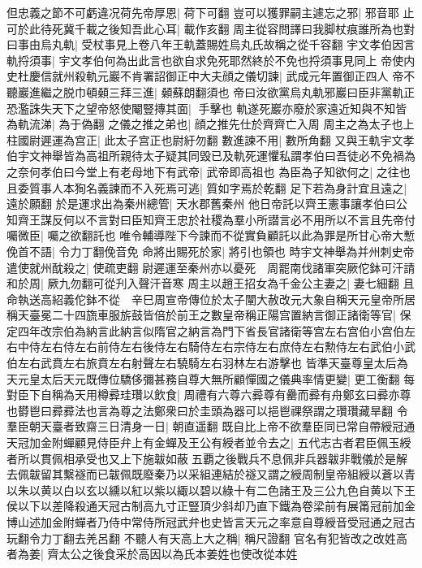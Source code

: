 但忠義之節不可虧違况荷先帝厚恩|{
	荷下可翻}
豈可以獲罪嗣主遽忘之邪|{
	邪音耶}
止可於此待死冀千載之後知吾此心耳|{
	載作亥翻}
周主從容問譯曰我脚杖痕誰所為也對曰事由烏丸軌|{
	受杖事見上卷八年王軌蓋賜姓烏丸氏故稱之從千容翻}
宇文孝伯因言軌捋須事|{
	宇文孝伯何為出此言也欲自求免死耶然終於不免也捋須事見同上}
帝使内史杜慶信就州殺軌元巖不肯署詔御正中大夫顔之儀切諫|{
	武成元年置御正四人}
帝不聽巖進繼之脱巾頓顙三拜三進|{
	顙蘇朗翻須也}
帝曰汝欲黨烏丸軌邪巖曰臣非黨軌正恐濫誅失天下之望帝怒使閹豎摶其面|{
	手擊也}
軌遂死巖亦廢於家遠近知與不知皆為軌流涕|{
	為于偽翻}
之儀之推之弟也|{
	顔之推先仕於齊齊亡入周}
周主之為太子也上柱國尉遲運為宫正|{
	此太子宫正也尉紆勿翻}
數進諫不用|{
	數所角翻}
又與王軌宇文孝伯宇文神舉皆為高祖所親待太子疑其同毁已及軌死運懼私謂孝伯曰吾徒必不免禍為之奈何孝伯曰今堂上有老母地下有武帝|{
	武帝即高祖也}
為臣為子知欲何之|{
	之往也}
且委質事人本狥名義諫而不入死焉可逃|{
	質如字焉於乾翻}
足下若為身計宜且遠之|{
	遠於願翻}
於是運求出為秦州總管|{
	天水郡舊秦州}
他日帝託以齊王憲事讓孝伯曰公知齊王謀反何以不言對曰臣知齊王忠於社稷為羣小所譛言必不用所以不言且先帝付囑微臣|{
	囑之欲翻託也}
唯令輔導陛下今諫而不從實負顧託以此為罪是所甘心帝大慙俛首不語|{
	令力丁翻俛音免}
命將出賜死於家|{
	將引也領也}
時宇文神舉為并州刺史帝遣使就州酖殺之|{
	使疏吏翻}
尉遲運至秦州亦以憂死　周罷南伐諸軍突厥佗鉢可汗請和於周|{
	厥九勿翻可從刋入聲汗音寒}
周主以趙王招女為千金公主妻之|{
	妻七細翻}
且命執送高紹義佗鉢不從　辛巳周宣帝傳位於太子闡大赦改元大象自稱天元皇帝所居稱天臺冕二十四旒車服旂鼓皆倍於前王之數皇帝稱正陽宫置納言御正諸衛等官|{
	保定四年改宗伯為納言此納言似隋官之納言為門下省長官諸衛等宫左右宫伯小宫伯左右中侍左右侍左右前侍左右後侍左右騎侍左右宗侍左右庶侍左右勲侍左右武伯小武伯左右武賁左右旅賁左右射聲左右驍騎左右羽林左右游擊也}
皆準天臺尊皇太后為天元皇太后天元既傳位驕侈彌甚務自尊大無所顧憚國之儀典率情更變|{
	更工衡翻}
每對臣下自稱為天用樽彛珪瓚以飲食|{
	周禮有六尊六彛尊有罍而彛有舟鄭玄曰彛亦尊也欎鬯曰彛彛法也言為尊之法鄭衆曰於圭頭為器可以挹鬯祼祭謂之瓚瓚藏旱翻}
令羣臣朝天臺者致齋三日清身一日|{
	朝直遥翻}
既自比上帝不欲羣臣同已常自帶綬冠通天冠加金附蟬顧見侍臣弁上有金蟬及王公有綬者並令去之|{
	五代志古者君臣佩玉綬者所以貫佩相承受也又上下施韍如蔽五覇之後戰兵不息佩非兵器韍非戰儀於是解去佩韍留其繫襚而已韍佩既廢秦乃以采組連結於襚又謂之綬周制皇帝組綬以蒼以青以朱以黄以白以玄以纁以紅以紫以緅以碧以綠十有二色諸王及三公九色自黄以下王侯以下以差降殺通天冠古制高九寸正豎頂少斜却乃直下鐵為卷梁前有展筩冠前加金博山述加金附蟬者乃侍中常侍所冠武弁也史皆言天元之率意自尊綬音受冠通之冠古玩翻令力丁翻去羌呂翻}
不聽人有天高上大之稱|{
	稱尺證翻}
官名有犯皆改之改姓高者為姜|{
	齊太公之後食采於高因以為氏本姜姓也使改從本姓}

